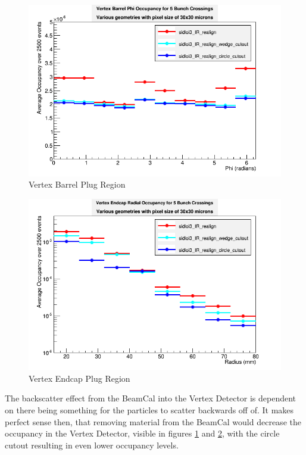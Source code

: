 \documentclass{report}
\begin{document}
                \begin{figure}[H] 
                    \includegraphics[width=\textwidth]{VradOccupancy_plug_brl}
                    \centering
                    \caption{Vertex Barrel Plug Region}
                    \label{fig__plug_vertex_brl}
                \end{figure}
                \begin{figure}[H] 
                    \includegraphics[width=\textwidth]{VradOccupancy_plug_ecp}
                    \centering
                    \caption{Vertex Endcap Plug Region}
                    \label{fig__plug_vertex_ecp}
                \end{figure}
                The backscatter effect from the BeamCal into the Vertex Detector is dependent on there being something for the particles to scatter backwards off of. It makes perfect sense then, that removing material from the BeamCal would decrease the occupancy in the Vertex Detector, visible in figures \ref{fig__plug_vertex_brl} and \ref{fig__plug_vertex_ecp}, with the circle cutout resulting in even lower occupancy levels.
                
\end{document}
